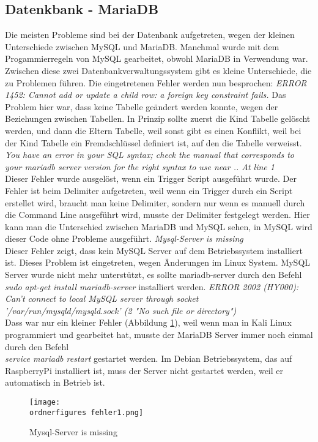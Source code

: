 \subsection{Datenkbank - MariaDB}
Die meisten Probleme sind bei der Datenbank aufgetreten, wegen der kleinen Unterschiede zwischen MySQL und MariaDB. Manchmal wurde mit dem Progammierregeln von MySQL gearbeitet, obwohl MariaDB in Verwendung war. Zwischen diese zwei Datenbankverwaltungssystem gibt es kleine Unterschiede, die zu Problemen führen. Die eingetretenen Fehler werden nun besprochen:
\bigbreak
\textit{ERROR 1452: Cannot add or update a child row: a foreign key constraint fails.}
Das Problem hier war, dass keine Tabelle geändert werden konnte, wegen der Beziehungen zwischen Tabellen. In Prinzip sollte zuerst die Kind Tabelle gelöscht werden, und dann die Eltern Tabelle, weil sonst gibt es einen Konflikt, weil bei der Kind Tabelle ein Fremdschlüssel definiert ist, auf den die Tabelle verweisst.
\bigbreak
\textit{You have an error in your SQL syntax; check the manual that corresponds to your mariadb server version for the right syntax to use near .. At line 1}\\
Dieser Fehler wurde ausgelöst, wenn ein Trigger Script ausgeführt wurde. Der Fehler ist beim Delimiter aufgetreten, weil wenn ein Trigger durch ein Script erstellet wird, braucht man keine Delimiter, sondern nur wenn es manuell durch die Command Line ausgeführt wird, musste der Delimiter festgelegt werden. Hier kann man die Unterschied zwischen MariaDB und MySQL sehen, in MySQL wird dieser Code ohne Probleme ausgeführt.
\bigbreak
\textit{Mysql-Server is missing}\\
Dieser Fehler zeigt, dass kein MySQL Server auf dem Betriebssystem installiert ist. Dieses Problem ist eingetreten, wegen Änderungen im Linux System. MySQL Server wurde nicht mehr unterstützt, es sollte mariadb-server durch den Befehl \textit{sudo apt-get install mariadb-server} installiert werden.
\bigbreak
\textit{ERROR 2002 (HY000): Can't connect to local MySQL server through socket \\'/var/run/mysqld/mysqld.sock' (2 "No such file or directory")}\\
Dass war nur ein kleiner Fehler (Abbildung \ref{fig:fehler1}), weil wenn man in Kali Linux programmiert und gearbeitet hat, musste der MariaDB Server immer noch einmal durch den Befehl \\ \textit{service mariadb restart} gestartet werden. Im Debian Betriebssystem, das auf RaspberryPi installiert ist, muss der Server nicht gestartet werden, weil er automatisch in Betrieb ist.
\begin{figure}[ht]
  \centering
    \texttt{[image: \\ordnerfigures fehler1.png]}
      \caption{Mysql-Server is missing}
      \label{fig:fehler1}
\end{figure}
